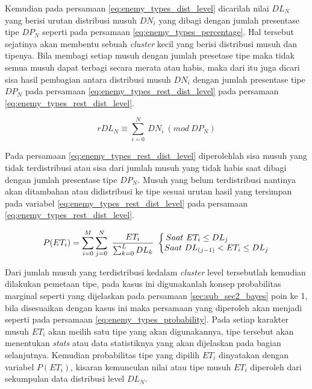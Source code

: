 Kemudian pada persamaan \ref{eq:enemy_types_dist_level} dicarilah nilai $DL_{N}$ yang berisi urutan distribusi musuh $DN_{i}$ yang dibagi dengan jumlah presentase tipe $DP_{N}$ seperti pada persamaan \ref{eq:enemy_types_percentage}. Hal tersebut sejatinya akan membentu sebuah \textit{cluster} kecil yang berisi distribusi musuh dan tipenya. Bila membagi setiap musuh dengan jumlah presetase tipe maka tidak semua musuh dapat terbagi secara merata atau habis, maka dari itu juga dicari sisa hasil pembagian antara distribusi musuh $DN_{i}$ dengan jumlah presentase tipe $DP_{N}$ pada persamaan \ref{eq:enemy_types_rest_dist_level} pada persamaan \ref{eq:enemy_types_rest_dist_level}.
\vspace{1ex}

\begin{equation}\label{eq:enemy_types_rest_dist_level}
rDL_{N} \equiv \sum_{i = 0}^{N}\ DN_{i}\ (mod\ DP_{N})
\end{equation}

Pada persamaan \ref{eq:enemy_types_rest_dist_level} diperolehlah sisa musuh yang tidak terdistribusi atau sisa dari jumlah musuh yang tidak habis saat dibagi dengan jumlah presentase tipe $DP_{N}$. Musuh yang belum terdistribusi nantinya akan ditambahan atau didistribusi ke tipe sesuai urutan hasil yang tersimpan pada variabel \ref{eq:enemy_types_rest_dist_level} pada persamaan \ref{eq:enemy_types_rest_dist_level}.
\vspace{2ex}

\begin{equation}\label{eq:enemy_types_probability}
P(ET_{i}) = \sum_{i = 0}^{M} \sum_{j = 0}^{N}\ \frac{ET_{i}}{\sum_{k = 0}^{L}DL_{k}}\
\left\{\begin{matrix}
\hspace{-4.6em} Saat\ ET_{i} \leq DL_{j} \\ 
Saat\ DL_{(j-1)} < ET_{i} \leq DL_{j}
\end{matrix}\right.
\end{equation}

Dari jumlah musuh yang terdistribusi kedalam \textit{cluster} level tersebutlah kemudian dilakukan pemetaan tipe, pada kasus ini digunakanlah konsep probabilitas marginal seperti yang dijelaskan pada persamaan \ref{sec:sub_sec2_bayes} poin ke 1, bila disesuaikan dengan kasus ini maka persamaan yang diperoleh akan menjadi seperti pada persamaan \ref{eq:enemy_types_probability}. Pada setiap karakter musuh $ET_{i}$ akan meilih satu tipe yang akan digunakannya, tipe tersebut akan menentukan \textit{stats} atau data statistiknya yang akan dijelaskan pada bagian selanjutnya. Kemudian probabilitas tipe yang dipilih $ET_{i}$ dinyatakan dengan variabel $P(ET_{i})$, kisaran kemunculan nilai atau tipe musuh $ET_{i}$ diperoleh dari sekumpulan data distribusi level $DL_{N}$.
\vspace{1ex}

